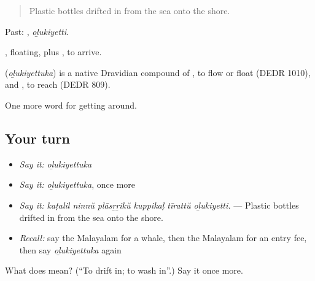 \begin{quote}
Plastic bottles drifted in from the sea onto the shore.
\end{quote}

Past: , \emph{oḻukiyetti}.

, floating, plus , to arrive.

\begin{cousinweb}
\textbf{} (\emph{oḻukiyettuka}) is a native Dravidian compound of , to flow or float (DEDR 1010), and , to reach (DEDR 809).
\end{cousinweb}

\begin{grammarlens}[title={What you've built}]
One more word for getting around.
\end{grammarlens}

\subsection*{Your turn}
\begin{itemize}
\raggedright
  \item \emph{Say it:} \emph{oḻukiyettuka}
  \item \emph{Say it:} \emph{oḻukiyettuka}, once more
  \item \emph{Say it:} \emph{kaṭalil ninnŭ plāsṟṟikŭ kuppikaḷ tīrattŭ oḻukiyetti.} — Plastic bottles drifted in from the sea onto the shore.
  \item \emph{Recall:} say the Malayalam for a whale, then the Malayalam for an entry fee, then say \emph{oḻukiyettuka} again
\end{itemize}

\begin{tcolorbox}[breakable,colback=teal!4,colframe=teal!35!black,title={Before you move on}]
What does  mean? (\textquotedblleft{}To drift in; to wash in\textquotedblright{}.) Say it once more.
\end{tcolorbox}
